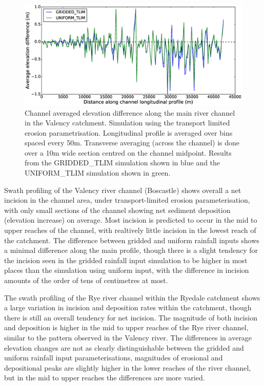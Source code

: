 \begin{figure}[htb]
\includegraphics[width=14cm]{chp06_figures_scripts/fig_swath_profile_ryedale_erode_tlim.eps}
\caption{Channel averaged elevation difference along the main river channel in the Valency catchment. Simulation using the transport limited erosion parametrisation. Longitudinal profile is averaged over bins spaced every 50m. Transverse averaging (across the channel) is done over a 10m wide section centred on the channel midpoint. Results from the GRIDDED\_TLIM simulation shown in blue and the UNIFORM\_TLIM simulation shown in green.}
\label{fig_ryedale_swath_tlim}
\end{figure}

Swath profiling of the Valency river channel (Boscastle) shows overall a net incision in the channel area, under transport-limited erosion parameterisation, with only small sections of the channel showing net sediment deposition (elevation increase) on average. Most incision is predicted to occur in the mid to upper reaches of the channel, with realtively little incision in the lowest reach of the catchment. The difference between gridded and uniform rainfall inputs shows a minimal difference along the main profile, though there is a slight tendency for the incision seen in the gridded rainfall input simulation to be higher in most places than the simulation using uniform input, with the difference in incision amounts of the order of tens of centimetres at most.

The swath profiling of the Rye river channel within the Ryedale catchment shows a large variation in incision and deposition rates within the catchment, though there is still an overall tendency for net incision. The magnitude of both incision and deposition is higher in the mid to upper reaches of the Rye river channel, similar to the pattern observed in the Valency river. The differences in average elevation changes are not as clearly distinguishable between the gridded and uniform rainfall input parameterisations, magnitudes of erosional and depositional peaks are slightly higher in the lower reaches of the river channel, but in the mid to upper reaches the differences are more varied. 
 
